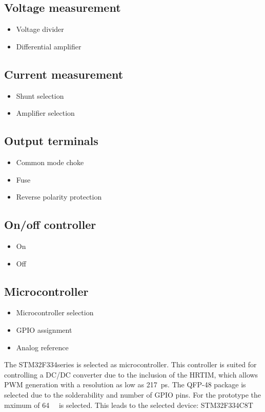 \FloatBarrier

\subsection{Voltage measurement}
\label{sec_volt_meas}
\begin{itemize}
    \item Voltage divider
    \item Differential amplifier
\end{itemize}

\FloatBarrier

\subsection{Current measurement}
\label{sec_cur_meas}
\begin{itemize}
    \item Shunt selection
    \item Amplifier selection
\end{itemize}

\FloatBarrier

\subsection{Output terminals}
\label{sec_out_term}
\begin{itemize}
    \item Common mode choke
    \item Fuse
    \item Reverse polarity protection
\end{itemize}

\FloatBarrier

\subsection{On/off controller}
\label{sec_onoff}
\begin{itemize}
    \item On
    \item Off
\end{itemize}

\FloatBarrier

\subsection{Microcontroller}
\label{sec_microcontroller}
\begin{itemize}
    \item Microcontroller selection
    \item GPIO assignment
    \item Analog reference
\end{itemize}
The STM32F334series is selected as microcontroller. This controller is suited for controlling a DC/DC converter due to the inclusion of the \ac{HRTIM}, which allows \ac{PWM} generation with a resolution as low as \qty{217}{\pico\second}. The QFP-48 package is selected due to the solderability and number of \ac{GPIO} pins. For the prototype the mximum of \qty{64}{\kibi\byte} is selected. This leads to the selected device: STM32F334C8T

